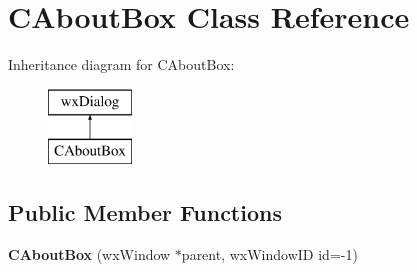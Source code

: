 \hypertarget{classCAboutBox}{}\section{C\+About\+Box Class Reference}
\label{classCAboutBox}
Inheritance diagram for C\+About\+Box\+:\begin{figure}[H]
\begin{center}
\leavevmode
\includegraphics[height=2.000000cm]{classCAboutBox}
\end{center}
\end{figure}
\subsection*{Public Member Functions}
\begin{DoxyCompactItemize}
\item 
\mbox{\label{classCAboutBox_ac23aeafcffb40eb72b01da54b7db8e37}} 
{\bfseries C\+About\+Box} (wx\+Window $\ast$parent, wx\+Window\+ID id=-\/1)
\end{DoxyCompactItemize}
